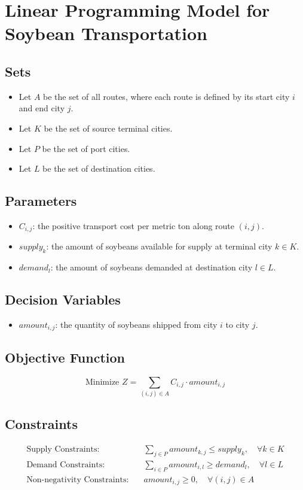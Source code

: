 \documentclass{article}
\begin{document}
\section*{Linear Programming Model for Soybean Transportation}

\subsection*{Sets}
\begin{itemize}
    \item Let \( A \) be the set of all routes, where each route is defined by its start city \( i \) and end city \( j \).
    \item Let \( K \) be the set of source terminal cities.
    \item Let \( P \) be the set of port cities.
    \item Let \( L \) be the set of destination cities.
\end{itemize}

\subsection*{Parameters}
\begin{itemize}
    \item \( C_{i,j} \): the positive transport cost per metric ton along route \( (i,j) \).
    \item \( supply_k \): the amount of soybeans available for supply at terminal city \( k \in K \).
    \item \( demand_l \): the amount of soybeans demanded at destination city \( l \in L \).
\end{itemize}

\subsection*{Decision Variables}
\begin{itemize}
    \item \( amount_{i,j} \): the quantity of soybeans shipped from city \( i \) to city \( j \).
\end{itemize}

\subsection*{Objective Function}
\[
\text{Minimize } Z = \sum_{(i,j) \in A} C_{i,j} \cdot amount_{i,j}
\]

\subsection*{Constraints}
\begin{align*}
\text{Supply Constraints:} & \quad \sum_{j \in P} amount_{k,j} \leq supply_k, \quad \forall k \in K \\
\text{Demand Constraints:} & \quad \sum_{i \in P} amount_{i,l} \geq demand_l, \quad \forall l \in L \\
\text{Non-negativity Constraints:} & \quad amount_{i,j} \geq 0, \quad \forall (i,j) \in A
\end{align*}
\end{document}
